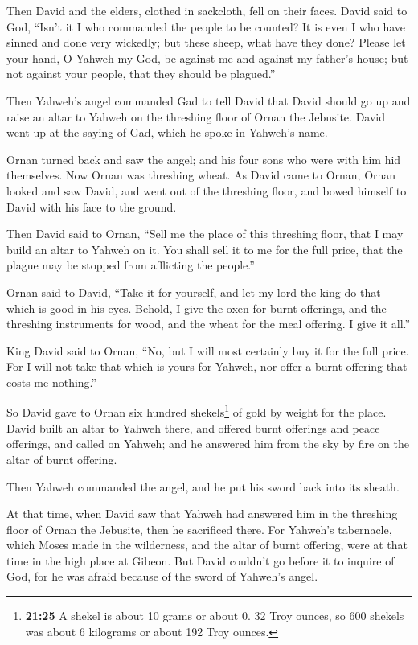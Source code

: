 Then David and the elders, clothed in sackcloth, fell on their faces.
 David said to God, ``Isn't it I who commanded the people
to be counted? It is even I who have sinned and done very wickedly; but
these sheep, what have they done? Please let your hand, O Yahweh my God,
be against me and against my father's house; but not against your
people, that they should be plagued.''

 Then Yahweh's angel commanded Gad to tell David that
David should go up and raise an altar to Yahweh on the threshing floor
of Ornan the Jebusite.  David went up at the saying of
Gad, which he spoke in Yahweh's name.

 Ornan turned back and saw the angel; and his four sons
who were with him hid themselves. Now Ornan was threshing wheat.
 As David came to Ornan, Ornan looked and saw David, and
went out of the threshing floor, and bowed himself to David with his
face to the ground.

 Then David said to Ornan, ``Sell me the place of this
threshing floor, that I may build an altar to Yahweh on it. You shall
sell it to me for the full price, that the plague may be stopped from
afflicting the people.''

 Ornan said to David, ``Take it for yourself, and let my
lord the king do that which is good in his eyes. Behold, I give the oxen
for burnt offerings, and the threshing instruments for wood, and the
wheat for the meal offering. I give it all.''

 King David said to Ornan, ``No, but I will most
certainly buy it for the full price. For I will not take that which is
yours for Yahweh, nor offer a burnt offering that costs me nothing.''

 So David gave to Ornan six hundred shekels\footnote{\textbf{21:25}
  A shekel is about 10 grams or about 0. 32 Troy ounces, so 600 shekels
  was about 6 kilograms or about 192 Troy ounces.} of gold by weight for
the place.  David built an altar to Yahweh there, and
offered burnt offerings and peace offerings, and called on Yahweh; and
he answered him from the sky by fire on the altar of burnt offering.

 Then Yahweh commanded the angel, and he put his sword
back into its sheath.

 At that time, when David saw that Yahweh had answered
him in the threshing floor of Ornan the Jebusite, then he sacrificed
there.  For Yahweh's tabernacle, which Moses made in the
wilderness, and the altar of burnt offering, were at that time in the
high place at Gibeon.  But David couldn't go before it to
inquire of God, for he was afraid because of the sword of Yahweh's
angel.

